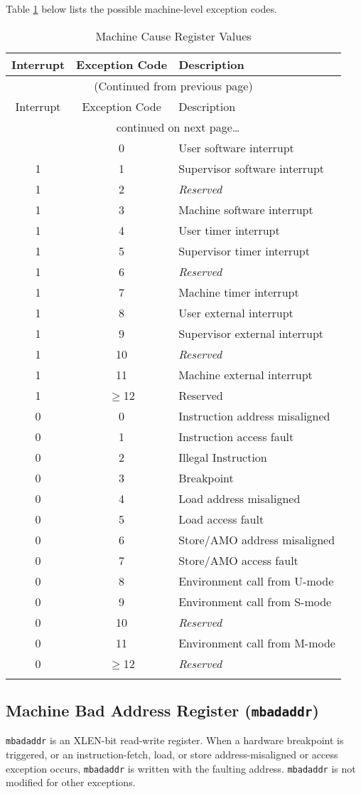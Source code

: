 Table \ref{tab:mcause-reg-values} below lists the possible machine-level exception codes.

\begin{longtable}[]{@{}ccl@{}}
\toprule
Interrupt & Exception Code & Description\tabularnewline
\midrule
\endfirsthead
\multicolumn{3}{c}{{(Continued from previous page)}} \\

\toprule
Interrupt & Exception Code & Description\tabularnewline
\midrule
\endhead

\midrule \multicolumn{3}{c}{{\tablename\ \thetable{} continued on next page\ldots}} \\
\endfoot

\endlastfoot
1 & 0 & User software interrupt\tabularnewline
1 & 1 & Supervisor software interrupt\tabularnewline
1 & 2 & \emph{Reserved}\tabularnewline
1 & 3 & Machine software interrupt\tabularnewline
1 & 4 & User timer interrupt\tabularnewline
1 & 5 & Supervisor timer interrupt\tabularnewline
1 & 6 & \emph{Reserved}\tabularnewline
1 & 7 & Machine timer interrupt\tabularnewline
1 & 8 & User external interrupt\tabularnewline
1 & 9 & Supervisor external interrupt\tabularnewline
1 & 10 & \emph{Reserved}\tabularnewline
1 & 11 & Machine external interrupt\tabularnewline
1 & $\geqslant$12 & Reserved\tabularnewline
\midrule
0 & 0 & Instruction address misaligned\tabularnewline
0 & 1 & Instruction access fault\tabularnewline
0 & 2 & Illegal Instruction\tabularnewline
0 & 3 & Breakpoint\tabularnewline
0 & 4 & Load address misaligned\tabularnewline
0 & 5 & Load access fault\tabularnewline
0 & 6 & Store/AMO address misaligned\tabularnewline
0 & 7 & Store/AMO access fault\tabularnewline
0 & 8 & Environment call from U-mode\tabularnewline
0 & 9 & Environment call from S-mode\tabularnewline
0 & 10 & \emph{Reserved}\tabularnewline
0 & 11 & Environment call from M-mode\tabularnewline
0 & $\geqslant$12 & \emph{Reserved}\tabularnewline
\bottomrule
\caption{Machine Cause Register Values}
\label{tab:mcause-reg-values}
\end{longtable}


\subsection{Machine Bad Address Register
({\tt mbadaddr})}\label{machine-bad-address-register-mbadaddr}

{\tt mbadaddr} is an XLEN-bit read-write register. When a hardware breakpoint
is triggered, or an instruction-fetch, load, or store address-misaligned
or access exception occurs, {\tt mbadaddr} is written with the faulting
address. {\tt mbadaddr} is not modified for other exceptions.

